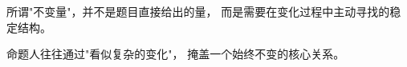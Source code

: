 \begin{ideaBox}
所谓"不变量"，并不是题目直接给出的量，
而是需要在变化过程中主动寻找的稳定结构。

命题人往往通过"看似复杂的变化"，
掩盖一个始终不变的核心关系。
\end{ideaBox}
